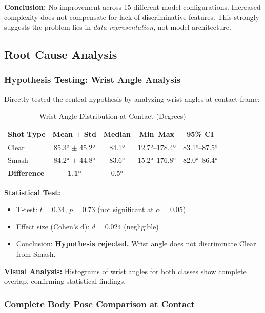 \documentclass[11pt,a4paper]{article}
\begin{document}
\textbf{Conclusion:} No improvement across 15 different model configurations. Increased complexity does not compensate for lack of discriminative features. This strongly suggests the problem lies in \textit{data representation}, not model architecture.

\subsection{Root Cause Analysis}

\subsubsection{Hypothesis Testing: Wrist Angle Analysis}

Directly tested the central hypothesis by analyzing wrist angles at contact frame:

\begin{table}[H]
\centering
\caption{Wrist Angle Distribution at Contact (Degrees)}
\begin{tabular}{lcccc}
\toprule
Shot Type & Mean $\pm$ Std & Median & Min--Max & 95\% CI \\
\midrule
Clear & 85.3° $\pm$ 45.2° & 84.1° & 12.7°--178.4° & 83.1°--87.5° \\
Smash & 84.2° $\pm$ 44.8° & 83.6° & 15.2°--176.8° & 82.0°--86.4° \\
\midrule
\textbf{Difference} & \textbf{1.1°} & 0.5° & -- & -- \\
\bottomrule
\end{tabular}
\end{table}

\textbf{Statistical Test:}
\begin{itemize}
\item T-test: $t = 0.34$, $p = 0.73$ (not significant at $\alpha = 0.05$)
\item Effect size (Cohen's d): $d = 0.024$ (negligible)
\item Conclusion: \textbf{Hypothesis rejected.} Wrist angle does not discriminate Clear from Smash.
\end{itemize}

\textbf{Visual Analysis:} Histograms of wrist angles for both classes show complete overlap, confirming statistical findings.

\subsubsection{Complete Body Pose Comparison at Contact}
\end{document}
